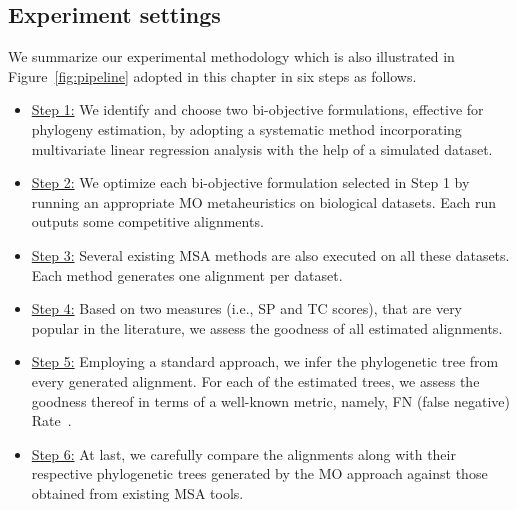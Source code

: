 \begin{figure}[!htbp]
\end{figure}

\subsection{Experiment settings}
\label{sec:exp_settings}
We summarize our experimental methodology which is also illustrated in Figure~\ref{fig:pipeline} adopted in this chapter in six steps as follows.
\begin{itemize}
	\item \underline{Step 1:} We identify and choose two bi-objective formulations, effective for phylogeny estimation, by adopting a systematic method incorporating multivariate linear regression analysis with the help of a simulated dataset. \item \underline{Step 2:} We optimize each bi-objective formulation selected in Step 1 by
	 running an appropriate MO metaheuristics on biological datasets. Each run outputs some competitive alignments. 
	\item \underline{Step 3:} Several existing MSA methods are also executed on all these datasets. Each method generates one alignment per dataset.
\item \underline{Step 4:} Based on two measures (i.e., SP and TC scores), that are very popular in the literature, we assess the goodness of all estimated alignments. \item \underline{Step 5:} Employing a standard approach, we infer the phylogenetic tree from every generated alignment. For each of the estimated trees, we assess the goodness thereof in terms of a well-known metric, namely, FN (false negative) Rate~\citep{warnow2017computational}.
	\item \underline{Step 6:} At last, we carefully compare the alignments along with their respective phylogenetic trees generated by the MO approach against those obtained from existing MSA tools. \end{itemize}

